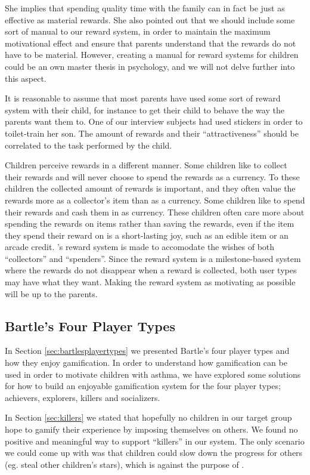She implies that spending quality time with the family can in fact be just as effective as material rewards. She also pointed out that we should include some sort of manual to our reward system, in order to maintain the maximum motivational effect and ensure that parents understand that the rewards do not have to be material. However, creating a manual for reward systems for children could be an own master thesis in psychology, and we will not delve further into this aspect. 

It is reasonable to assume that most parents have used some sort of reward system with their child, for instance to get their child to behave the way the parents want them to. One of our interview subjects had used stickers in order to toilet-train her son. The amount of rewards and their ``attractiveness'' should be correlated to the task performed by the child.

Children perceive rewards in a different manner. Some children like to collect their rewards and will never choose to spend the rewards as a currency. To these children the collected amount of rewards is important, and they often value the rewards more as a collector's item than as a currency. 
Some children like to spend their rewards and cash them in as currency. These children often care more about spending the rewards on items rather than saving the rewards, even if the item they spend their reward on is a short-lasting joy, such as an edible item or an arcade credit.
\app{}'s reward system is made to accomodate the wishes of both ``collectors'' and ``spenders''. Since the reward system is a milestone-based system where the rewards do not disappear when a reward is collected, both user types may have what they want. Making the reward system as motivating as possible will be up to the parents.


\subsection{Bartle's Four Player Types}
\label{sec:bartlesfourplayertypes}
In Section \ref{sec:bartlesplayertypes} we presented Bartle's four player types and how they enjoy gamification. In order to understand how gamification can be used in order to motivate children with asthma, we have explored some solutions for how to build an enjoyable gamification system for the four player types; achievers, explorers, killers and socializers. 


In Section \ref{sec:killers} we stated that hopefully no children in our target group hope to gamify their experience by imposing themselves on others. We found no positive and meaningful way to support ``killers'' in our system. The only scenario we could come up with was that children could slow down the progress for others (eg. steal other children's stars), which is against the purpose of \app{}.  

